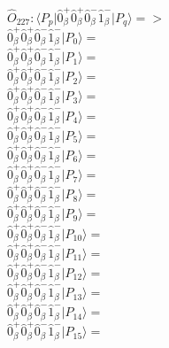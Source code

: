 \documentclass[14pt]{article}
\begin{document}
    $\hat{O}_{227}:  \langle{P_p}\vert \hat{0}_{\beta}^{+}\hat{0}_{\beta}^{+}\hat{0}_{\beta}^{-}\hat{1}_{\beta}^{-} \vert{P_q}\rangle => $ \\ 
    $ \hat{0}_{\beta}^{+}\hat{0}_{\beta}^{+}\hat{0}_{\beta}^{-}\hat{1}_{\beta}^{-} \vert{P_{0}}\rangle =  $ \\ 
    $ \hat{0}_{\beta}^{+}\hat{0}_{\beta}^{+}\hat{0}_{\beta}^{-}\hat{1}_{\beta}^{-} \vert{P_{1}}\rangle =  $ \\ 
    $ \hat{0}_{\beta}^{+}\hat{0}_{\beta}^{+}\hat{0}_{\beta}^{-}\hat{1}_{\beta}^{-} \vert{P_{2}}\rangle =  $ \\ 
    $ \hat{0}_{\beta}^{+}\hat{0}_{\beta}^{+}\hat{0}_{\beta}^{-}\hat{1}_{\beta}^{-} \vert{P_{3}}\rangle =  $ \\ 
    $ \hat{0}_{\beta}^{+}\hat{0}_{\beta}^{+}\hat{0}_{\beta}^{-}\hat{1}_{\beta}^{-} \vert{P_{4}}\rangle =  $ \\ 
    $ \hat{0}_{\beta}^{+}\hat{0}_{\beta}^{+}\hat{0}_{\beta}^{-}\hat{1}_{\beta}^{-} \vert{P_{5}}\rangle =  $ \\ 
    $ \hat{0}_{\beta}^{+}\hat{0}_{\beta}^{+}\hat{0}_{\beta}^{-}\hat{1}_{\beta}^{-} \vert{P_{6}}\rangle =  $ \\ 
    $ \hat{0}_{\beta}^{+}\hat{0}_{\beta}^{+}\hat{0}_{\beta}^{-}\hat{1}_{\beta}^{-} \vert{P_{7}}\rangle =  $ \\ 
    $ \hat{0}_{\beta}^{+}\hat{0}_{\beta}^{+}\hat{0}_{\beta}^{-}\hat{1}_{\beta}^{-} \vert{P_{8}}\rangle =  $ \\ 
    $ \hat{0}_{\beta}^{+}\hat{0}_{\beta}^{+}\hat{0}_{\beta}^{-}\hat{1}_{\beta}^{-} \vert{P_{9}}\rangle =  $ \\ 
    $ \hat{0}_{\beta}^{+}\hat{0}_{\beta}^{+}\hat{0}_{\beta}^{-}\hat{1}_{\beta}^{-} \vert{P_{10}}\rangle =  $ \\ 
    $ \hat{0}_{\beta}^{+}\hat{0}_{\beta}^{+}\hat{0}_{\beta}^{-}\hat{1}_{\beta}^{-} \vert{P_{11}}\rangle =  $ \\ 
    $ \hat{0}_{\beta}^{+}\hat{0}_{\beta}^{+}\hat{0}_{\beta}^{-}\hat{1}_{\beta}^{-} \vert{P_{12}}\rangle =  $ \\ 
    $ \hat{0}_{\beta}^{+}\hat{0}_{\beta}^{+}\hat{0}_{\beta}^{-}\hat{1}_{\beta}^{-} \vert{P_{13}}\rangle =  $ \\ 
    $ \hat{0}_{\beta}^{+}\hat{0}_{\beta}^{+}\hat{0}_{\beta}^{-}\hat{1}_{\beta}^{-} \vert{P_{14}}\rangle =  $ \\ 
    $ \hat{0}_{\beta}^{+}\hat{0}_{\beta}^{+}\hat{0}_{\beta}^{-}\hat{1}_{\beta}^{-} \vert{P_{15}}\rangle =  $ \\ 
    
\end{document}
